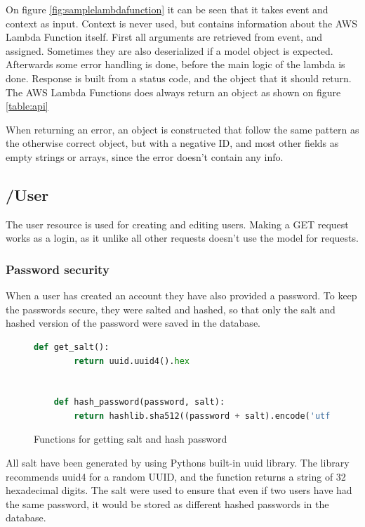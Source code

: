 On figure \ref{fig:samplelambdafunction} it can be seen that it takes event and context as input. Context is never used, but contains information about the AWS Lambda Function itself.
First all arguments are retrieved from event, and assigned. Sometimes they are also deserialized if a model object is expected. Afterwards some error handling is done, before the main logic of the lambda is done.
Response is built from a status code, and the object that it should return. The AWS Lambda Functions does always return an object as shown on figure \ref{table:api}

When returning an error, an object is constructed that follow the same pattern as the otherwise correct object, but with a negative ID, and most other fields as empty strings or arrays, since the error doesn't contain any info.

\subsection*{/User}
The user resource is used for creating and editing users. Making a GET request works as a login, as it unlike all other requests doesn't use the model for requests.

\subsubsection*{Password security}
When a user has created an account they have also provided a password. To keep the passwords secure, they were salted and hashed, so that only the salt and hashed version of the password were saved in the database.

\begin{figure}[H]
    \centering
    \begin{lstlisting}[language=Python]
    def get_salt():
        return uuid.uuid4().hex


    def hash_password(password, salt):
        return hashlib.sha512((password + salt).encode('utf-8')).hexdigest()
    \end{lstlisting}
    \caption{Functions for getting salt and hash password}
    \label{fig:passwordhashing}
\end{figure}

All salt have been generated by using Pythons built-in uuid library\cite{Python:UUID}. The library recommends uuid4 for a random UUID, and the function returns a string of 32 hexadecimal digits. The salt were used to ensure that even if two users have had the same password, it would be stored as different hashed passwords in the database.

